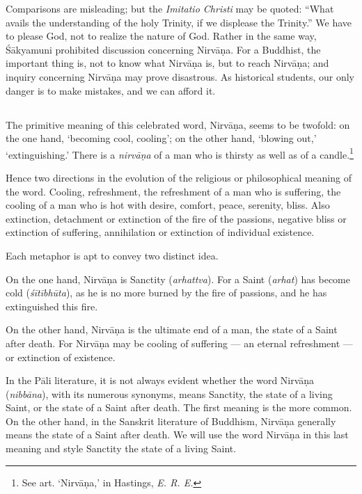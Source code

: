 \documentclass[a4paper, 11pt, oneside, english]{article}
\begin{document}
Comparisons are misleading; but the \emph{Imitatio Christi} may be quoted: ``What avails the understanding of the holy Trinity, if we displease the Trinity.'' We have to please God, not to realize the nature of God. Rather in the same way, Śākyamuni prohibited discussion concerning Nirvāṇa. For a Buddhist, the important thing is, not to know what Nirvāṇa is, but to reach Nirvāṇa; and inquiry concerning Nirvāṇa may prove disastrous. As historical students, our only danger is to make mistakes, and we can afford it.

\subsection{}
\paragraph{}
The primitive meaning of this celebrated word, Nirvāṇa, seems to be twofold: on the one hand, `becoming cool, cooling'; on the other hand, `blowing out,' `extinguishing.' There is a \emph{nirvāṇa} of a man who is thirsty as well as of a candle.\footnote{See art. `Nirvāṇa,' in Hastings, \emph{E. R. E.}}

Hence two directions in the evolution of the religious or philosophical meaning of the word. Cooling, refreshment, the refreshment of a man who is suffering, the cooling of a man who is hot with desire, comfort, peace, serenity, bliss. Also extinction, detachment or extinction of the fire of the passions, negative bliss or extinction of suffering, annihilation or extinction of individual existence.

Each metaphor is apt to convey two distinct idea.

On the one hand, Nirvāṇa is Sanctity (\emph{arhattva}). For a Saint (\emph{arhat}) has become cold (\emph{śītībhūta}), as he is no more burned by the fire of passions, and he has extinguished this fire.

On the other hand, Nirvāṇa is the ultimate end of a man, the state of a Saint after death. For Nirvāṇa may be cooling of suffering --- an eternal refreshment --- or extinction of existence.

In the Pāli literature, it is not always evident whether the word Nirvāṇa (\emph{nibbāna}), with its numerous synonyms, means Sanctity, the state of a living Saint, or the state of a Saint after death. The first meaning is the more common. On the other hand, in the Sanskrit literature of Buddhism, Nirvāṇa generally means the state of a Saint after death. We will use the word Nirvāṇa in this last meaning and style Sanctity the state of a living Saint.
\end{document}
